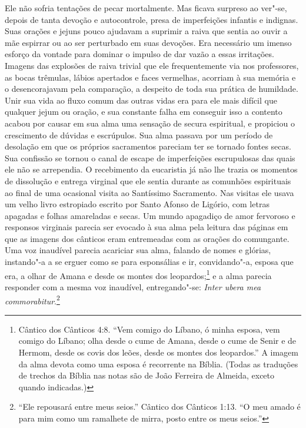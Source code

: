 Ele não sofria tentações de pecar mortalmente. Mas ficava surpreso ao
ver"-se, depois de tanta devoção e autocontrole, presa de imperfeições
infantis e indignas. Suas orações e jejuns pouco ajudavam a suprimir a
raiva que sentia ao ouvir a mãe espirrar ou ao ser perturbado em suas
devoções. Era necessário um imenso esforço da vontade para dominar o
impulso de dar vazão a essas irritações. Imagens das explosões de raiva
trivial que ele frequentemente via nos professores, as bocas trêmulas,
lábios apertados e faces vermelhas, acorriam à sua memória e o
desencorajavam pela comparação, a despeito de toda sua prática de
humildade. Unir sua vida ao fluxo comum das outras vidas era para ele
mais difícil que qualquer jejum ou oração, e sua constante falha em
conseguir isso a contento acabou por causar em sua alma uma sensação de
secura espiritual, e propiciou o crescimento de dúvidas e escrúpulos.
Sua alma passava por um período de desolação em que os próprios
sacramentos pareciam ter se tornado fontes secas. Sua confissão se
tornou o canal de escape de imperfeições escrupulosas das quais ele não
se arrependia. O recebimento da eucaristia já não lhe trazia os
momentos de dissolução e entrega virginal que ele sentia durante as
comunhões espirituais ao final de uma ocasional visita ao Santíssimo
Sacramento. Nas visitas ele usava um velho livro estropiado escrito por
Santo Afonso de Ligório, com letras apagadas e folhas amareladas e
secas. Um mundo apagadiço de amor fervoroso e responsos virginais
parecia ser evocado à sua alma pela leitura das páginas em que as
imagens dos cânticos eram entremeadas com as orações do comungante. Uma
voz inaudível parecia acariciar sua alma, falando de nomes e glórias,
instando"-a a se erguer como se para esponsálias e ir, convidando"-a,
esposa que era, a olhar de Amana e desde os montes dos
leopardos;\footnote{ Cântico dos Cânticos 4:8. “Vem comigo do Líbano, ó
minha esposa, vem comigo do Líbano; olha desde o cume de Amana, desde o
cume de Senir e de Hermom, desde os covis dos leões, desde os montes
dos leopardos.” A imagem da alma devota como uma esposa é recorrente na
Bíblia. (Todas as traduções de trechos da Bíblia nas notas são de João Ferreira de Almeida, 
exceto quando indicadas.)} e a alma parecia responder com a mesma voz inaudível,
entregando"-se: \textit{Inter ubera mea commorabitur}.\footnote{ “Ele
repousará entre meus seios.” Cântico dos Cânticos 1:13. “O meu amado é
para mim como um ramalhete de mirra, posto entre os meus
seios.”}


